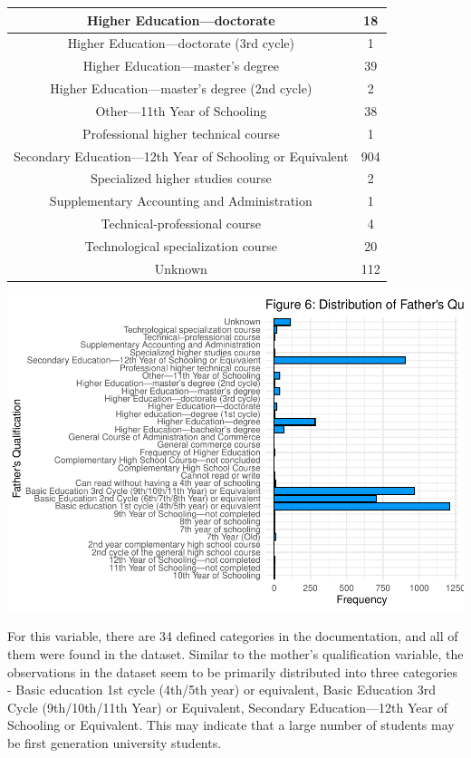 \documentclass[
]{article}
\begin{document}
\begin{table}
\begin{tabular}[t]{c|c}
\hline
Higher Education—doctorate & 18\\
\hline
Higher Education—doctorate (3rd cycle) & 1\\
\hline
Higher Education—master’s degree & 39\\
\hline
Higher Education—master’s degree (2nd cycle) & 2\\
\hline
Other—11th Year of Schooling & 38\\
\hline
Professional higher technical course & 1\\
\hline
Secondary Education—12th Year of Schooling or Equivalent & 904\\
\hline
Specialized higher studies course & 2\\
\hline
Supplementary Accounting and Administration & 1\\
\hline
Technical-professional course & 4\\
\hline
Technological specialization course & 20\\
\hline
Unknown & 112\\
\hline
\end{tabular}
\end{table}

\begin{center}\includegraphics{finalproj_files/figure-latex/unnamed-chunk-11-1} \end{center}

For this variable, there are 34 defined categories in the documentation,
and all of them were found in the dataset. Similar to the mother's
qualification variable, the observations in the dataset seem to be
primarily distributed into three categories - Basic education 1st cycle
(4th/5th year) or equivalent, Basic Education 3rd Cycle (9th/10th/11th
Year) or Equivalent, Secondary Education---12th Year of Schooling or
Equivalent. This may indicate that a large number of students may be
first generation university students.
\end{document}
